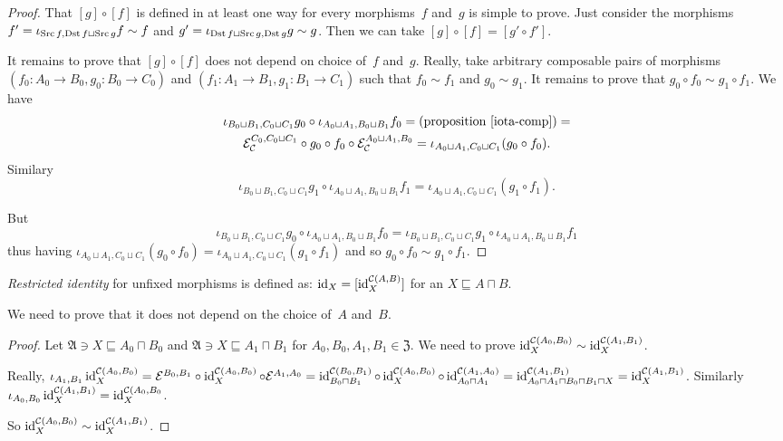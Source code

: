 \begin{proof}
That $[g]\circ[f]$ is defined in at least one way for every
morphisms~$f$ and~$g$ is simple to prove. Just consider the
morphisms
$f'=\iota_{\operatorname{Src} f,\operatorname{Dst} f\sqcup\operatorname{Src} g}f\sim f$ and
$g'=\iota_{\operatorname{Dst} f\sqcup\operatorname{Src} g,\operatorname{Dst} g}g\sim g$.
Then we can take $[g]\circ[f]=[g'\circ f']$.

It remains to prove that $[g]\circ[f]$ does not depend on
choice of~$f$ and~$g$. Really, take arbitrary composable
pairs of morphisms $(f_0:A_0\to B_0,g_0:B_0\to C_0)$ and
$(f_1:A_1\to B_1,g_1:B_1\to C_1)$ such that
$f_0\sim f_1$ and $g_0\sim g_1$. It remains to prove that
$g_0\circ f_0\sim g_1\circ f_1$.
We have
\begin{multline*}
\iota_{B_0\sqcup B_1,C_0\sqcup C_1}g_0 \circ
\iota_{A_0\sqcup A_1,B_0\sqcup B_1}f_0
= \text{(proposition~\ref{iota-comp})} = \\
\mathcal{E}_{\mathcal{C}}^{C_0,C_0\sqcup C_1}\circ g_0 \circ
f_0\circ\mathcal{E}_{\mathcal{C}}^{A_0\sqcup A_1,B_0} =
\iota_{A_0\sqcup A_1,C_0\sqcup C_1}(g_0\circ f_0).
\end{multline*}
Similary
\[\iota_{B_0\sqcup B_1,C_0\sqcup C_1}g_1 \circ
\iota_{A_0\sqcup A_1,B_0\sqcup B_1}f_1 =
\iota_{A_0\sqcup A_1,C_0\sqcup C_1}(g_1\circ f_1).\]

But
\[\iota_{B_0\sqcup B_1,C_0\sqcup C_1}g_0 \circ
\iota_{A_0\sqcup A_1,B_0\sqcup B_1}f_0 =
\iota_{B_0\sqcup B_1,C_0\sqcup C_1}g_1 \circ
\iota_{A_0\sqcup A_1,B_0\sqcup B_1}f_1\]
thus having
$\iota_{A_0\sqcup A_1,C_0\sqcup C_1}(g_0\circ f_0) =
\iota_{A_0\sqcup A_1,C_0\sqcup C_1}(g_1\circ f_1)$ and so
$g_0\circ f_0\sim g_1\circ f_1$.
\end{proof}

\begin{defn}
\emph{Restricted identity} for unfixed morphisms is
defined as: $\operatorname{id}_X = [\operatorname{id}^{\mathcal{C}(A,B)}_X]$ for
an $X\sqsubseteq A\sqcap B$.
\end{defn}

We need to prove that it does not depend on the choice
of~$A$ and~$B$.

\begin{proof}
Let $\mathfrak{A}\ni X\sqsubseteq A_0\sqcap B_0$ and
$\mathfrak{A}\ni X\sqsubseteq A_1\sqcap B_1$ for
$A_0,B_0,A_1,B_1\in\mathfrak{Z}$. We need to prove
$\operatorname{id}^{\mathcal{C}(A_0,B_0)}_X\sim
\operatorname{id}^{\mathcal{C}(A_1,B_1)}_X$.

Really, $\iota_{A_1,B_1}\operatorname{id}^{\mathcal{C}(A_0,B_0)}_X =
\mathcal{E}^{B_0,B_1}\circ\operatorname{id}^{\mathcal{C}(A_0,B_0)}_X
\circ \mathcal{E}^{A_1,A_0} =
\operatorname{id}^{\mathcal{C}(B_0,B_1)}_{B_0\sqcap B_1}\circ
\operatorname{id}^{\mathcal{C}(A_0,B_0)}_X\circ
\operatorname{id}^{\mathcal{C}(A_1,A_0)}_{A_0\sqcap A_1} =
\operatorname{id}^{\mathcal{C}(A_1,B_1)}_{A_0\sqcap A_1\sqcap B_0\sqcap B_1\sqcap X} =
\operatorname{id}^{\mathcal{C}(A_1,B_1)}_X$.
Similarly
$\iota_{A_0,B_0}\operatorname{id}^{\mathcal{C}(A_1,B_1)}_X =
\operatorname{id}^{\mathcal{C}(A_0,B_0}_X$.

So $\operatorname{id}^{\mathcal{C}(A_0,B_0)}_X\sim
\operatorname{id}^{\mathcal{C}(A_1,B_1)}_X$.
\end{proof}

